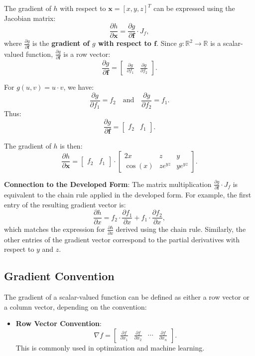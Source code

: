 \begin{notechapter}
The gradient of \( h \) with respect to \( \mathbf{x} = [x, y, z]^T \) can be expressed using the Jacobian matrix:
\[
\frac{\partial h}{\partial \mathbf{x}} = \frac{\partial g}{\partial \mathbf{f}} \cdot J_f,
\]
where \( \frac{\partial g}{\partial \mathbf{f}} \) is the \textbf{gradient of \( g \) with respect to \( \mathbf{f} \)}. Since \( g: \mathbb{R}^2 \rightarrow \mathbb{R} \) is a scalar-valued function, \( \frac{\partial g}{\partial \mathbf{f}} \) is a row vector:
\[
\frac{\partial g}{\partial \mathbf{f}} = \begin{bmatrix} \frac{\partial g}{\partial f_1} & \frac{\partial g}{\partial f_2} \end{bmatrix}.
\]

For \( g(u, v) = u \cdot v \), we have:
\[
\frac{\partial g}{\partial f_1} = f_2 \quad \text{and} \quad \frac{\partial g}{\partial f_2} = f_1.
\]
Thus:
\[
\frac{\partial g}{\partial \mathbf{f}} = \begin{bmatrix} f_2 & f_1 \end{bmatrix}.
\]

The gradient of \( h \) is then:
\[
\frac{\partial h}{\partial \mathbf{x}} = \begin{bmatrix} f_2 & f_1 \end{bmatrix} \cdot \begin{bmatrix}
2x & z & y \\
\cos(x) & z e^{yz} & y e^{yz}
\end{bmatrix}.
\]

\textbf{Connection to the Developed Form}:
The matrix multiplication \( \frac{\partial g}{\partial \mathbf{f}} \cdot J_f \) is equivalent to the chain rule applied in the developed form. For example, the first entry of the resulting gradient vector is:
\[
\frac{\partial h}{\partial x} = f_2 \cdot \frac{\partial f_1}{\partial x} + f_1 \cdot \frac{\partial f_2}{\partial x},
\]
which matches the expression for \( \frac{\partial h}{\partial x} \) derived using the chain rule. Similarly, the other entries of the gradient vector correspond to the partial derivatives with respect to \( y \) and \( z \).

\subsection{Gradient Convention}
The gradient of a scalar-valued function can be defined as either a row vector or a column vector, depending on the convention:
\begin{itemize}
    \item \textbf{Row Vector Convention}:
    \[
    \nabla f = \begin{bmatrix} \frac{\partial f}{\partial x_1} & \frac{\partial f}{\partial x_2} & \cdots & \frac{\partial f}{\partial x_n} \end{bmatrix}.
    \]
    This is commonly used in optimization and machine learning.


\end{itemize}
\end{notechapter}
